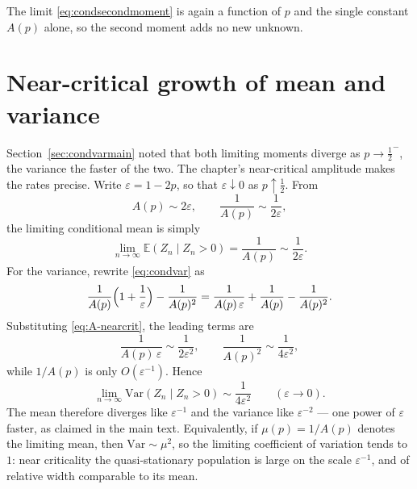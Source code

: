 The limit \eqref{eq:condsecondmoment} is again a function of $p$ and the single constant $A(p)$ alone, so the second moment adds no new unknown.

\section{Near-critical growth of mean and variance}
\label{app:nearcritmoments}

Section~\ref{sec:condvarmain} noted that both limiting moments diverge as
$p\to\tfrac12^-$, the variance the faster of the two. The chapter's near-critical
amplitude makes the rates precise. Write $\varepsilon=1-2p$, so that
$\varepsilon\downarrow0$ as $p\uparrow\tfrac12$. From
\begin{equation}
\label{eq:A-nearcrit}
A(p)\sim 2\varepsilon,
\qquad
\frac1{A(p)}\sim\frac1{2\varepsilon},
\end{equation}
the limiting conditional mean is simply
\begin{equation}
\label{eq:mean-nearcrit}
\lim_{n\to\infty}\mathbb{E}(Z_n\mid Z_n>0)
= \frac1{A(p)}
\sim \frac1{2\varepsilon}.
\end{equation}
For the variance, rewrite \eqref{eq:condvar} as
\[
\frac1{A(p)}\Bigl(1+\frac1\varepsilon\Bigr)
- \frac1{A(p)^2}
= \frac1{A(p)\,\varepsilon}
+ \frac1{A(p)}
- \frac1{A(p)^2}.
\]
Substituting \eqref{eq:A-nearcrit}, the leading terms are
\[
\frac1{A(p)\,\varepsilon}
\sim \frac1{2\varepsilon^2},
\qquad
\frac1{A(p)^2}
\sim \frac1{4\varepsilon^2},
\]
while $1/A(p)$ is only $O(\varepsilon^{-1})$. Hence
\begin{equation}
\label{eq:var-nearcrit}
\lim_{n\to\infty}\mathrm{Var}(Z_n\mid Z_n>0)
\sim \frac1{4\varepsilon^2}
\qquad(\varepsilon\to0).
\end{equation}
The mean therefore diverges like $\varepsilon^{-1}$ and the variance like
$\varepsilon^{-2}$ --- one power of $\varepsilon$ faster, as claimed in the main
text. Equivalently, if $\mu(p)=1/A(p)$ denotes the limiting mean, then
$\mathrm{Var}\sim\mu^2$, so the limiting coefficient of variation tends to~$1$:
near criticality the quasi-stationary population is large on the scale
$\varepsilon^{-1}$, and of relative width comparable to its mean.
\endgroup
\restoretoc
